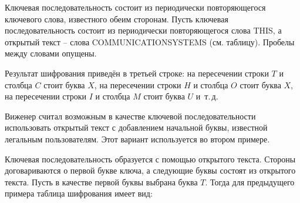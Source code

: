 \example
Ключевая последовательность состоит из периодически повторяющегося ключевого слова, известного обеим сторонам. Пусть ключевая последовательность состоит из периодически повторяющегося слова THIS, а открытый текст -- слова COMMUNICATIONSYSTEMS (см. таблицу). Пробелы между словами опущены.
\begin{center}  \end{center}
Результат шифрования приведён в третьей строке: на пересечении строки $T$ и столбца $C$ стоит буква $X$, на пересечении строки $H$ и столбца $O$ стоит буква $X$, на пересечении строки $I$ и столбца $M$ стоит буква $U$ и~т.\,д.
\exampleend

Виженер считал возможным в качестве ключевой последовательности использовать открытый текст с добавлением начальной буквы, известной легальным пользователям. Этот вариант используется во втором примере.

\example
Ключевая последовательность образуется с помощью открытого текста. Стороны договариваются о первой букве ключа, а следующие буквы состоят из открытого текста. Пусть в качестве первой буквы выбрана буква $T$. Тогда для предыдущего примера таблица шифрования имеет вид:
\begin{center}  \end{center}
\exampleend

